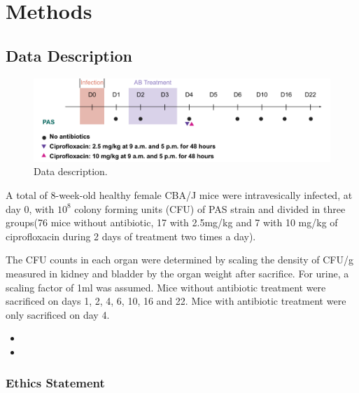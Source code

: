 \documentclass{article}
\begin{document}
\section{Methods}






\subsection{Data Description}
\begin{figure}
	\centering
	\includegraphics[width=0.8\linewidth]{images/draw_Anoruti_flowchart_PAS.pdf}
	\caption{Data description. }
\end{figure}


A total of  8-week-old healthy female CBA/J mice were intravesically infected, at day 0, with $10^8$ colony forming units (CFU) of PAS strain\cite{kotula2014programmable} and divided in three groups\cite{amoura2024variability}(76 mice without antibiotic, 17 with 2.5mg/kg and 7 with 10 mg/kg of ciprofloxacin during 2 days of treatment two times a day).




The CFU counts in each organ were determined by scaling the density of CFU/g measured in kidney and bladder by the organ weight after sacrifice. For urine, a scaling factor of 1ml was assumed. Mice without antibiotic treatment were sacrificed on days 1, 2, 4, 6, 10, 16 and 22. Mice with antibiotic treatment were only sacrificed on day 4.


\begin{itemize}
	\item {}
	\item {}
\end{itemize}


\subsubsection{Ethics Statement} 
\end{document}
